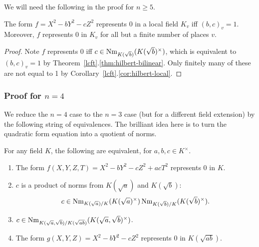 We will need the following in the proof for $n\ge 5$.
\begin{lem}
The form $f=X^2-bY^2-cZ^2$ represents 0 in a local field $K_v$ iff $(b,c)_v=1$. Moreover, $f$ represents 0 in $K_v$ for all but a finite number of places $v$.
\end{lem}
\begin{proof}
Note $f$ represents 0 iff $c\in \operatorname{Nm}_{K(\sqrt{b})}(K(\sqrt{b})^{\times})$, which is equivalent to $(b,c)_v=1$ by Theorem~\ref{lcft}.\ref{thm:hilbert-bilinear}. Only finitely many of these are not equal to 1 by Corollary~\ref{lcft}.\ref{cor:hilbert-local}.
\end{proof}
\subsubsection{Proof for $n=4$}
We reduce the $n=4$ case to the $n=3$ case (but for a different field extension) by the following string of equivalences. The brilliant idea here is to turn the quadratic form equation into a quotient of norms.
\begin{thm}
For any field $K$, the following are equivalent, for $a,b,c\in K^{\times}$.
\begin{enumerate}
\item
The form $f(X,Y,Z,T)=X^2-bY^2-cZ^2+acT^2$ represents 0 in $K$.
\item
$c$ is a product of norms from $K(\sqrt a)$ and $K(\sqrt b)$: \[c\in \operatorname{Nm}_{K(\sqrt{a})/K}(K(\sqrt{a})^{\times})\operatorname{Nm}_{K(\sqrt{b})/K}(K(\sqrt{b})^{\times}).\]
\item
$c\in \operatorname{Nm}_{K(\sqrt a,\sqrt b)/K(\sqrt{ab})}(K(\sqrt a,\sqrt b)^{\times})$.
\item
The form $g(X,Y,Z)=X^2-bY^2-cZ^2$ represents 0 in $K(\sqrt{ab})$.
\end{enumerate}
\end{thm}
